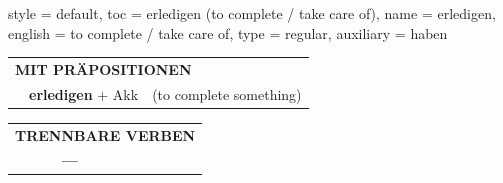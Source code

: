 \begin{verbentry}{
  style = {default},
  toc = {erledigen (to complete / take care of)},
  name = {erledigen},
  english = {to complete / take care of},
  type = {regular},
  auxiliary = {haben}
}
\vspace{10pt}

\begin{tabular}{lll}
\multicolumn{3}{l}{\textbf{MIT PRÄPOSITIONEN}}\\
& \textbf{erledigen} + Akk & (to complete something)\\
\end{tabular}
\hfill
\begin{tabular}{lll}
\multicolumn{3}{l}{\textbf{TRENNBARE VERBEN}}\\
& \textbf{---} & \\
\end{tabular}

\vspace{-5pt}
\end{verbentry}

